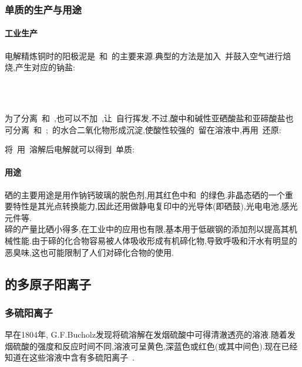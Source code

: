 \documentclass{ctexbook}
\begin{document}
\subsubsection{单质的生产与用途}
\paragraph{工业生产}
电解精炼铜时的阳极泥是~和~的主要来源\cite{Wang2016}.典型的方法是加入~并鼓入空气进行焙烧,产生对应的钠盐:
\begin{center}
    \\
    \\
\end{center}
为了分离~和~,也可以不加~,让~自行挥发.不过,酸中和碱性亚硒酸盐和亚碲酸盐也可分离~和~;~的水合二氧化物形成沉淀,使酸性较强的~留在溶液中,再用~还原:
\begin{center}
\end{center}
将~用~溶解后电解就可以得到~单质:
\begin{center}
\end{center}
\paragraph{用途}
硒的主要用途是用作钠钙玻璃的脱色剂,用其红色中和~的绿色.非晶态硒的一个重要特性是其光点转换能力,因此还用做静电复印中的光导体(即硒鼓),光电电池,感光元件等.\\
\indent 碲的产量比硒小得多,在工业中的应用也有限,基本用于低碳钢的添加剂以提高其机械性能.由于碲的化合物容易被人体吸收形成有机碲化物,导致呼吸和汗水有明显的恶臭味,这也可能限制了人们对碲化合物的使用.
\subsection{的多原子阳离子}
\subsubsection{多硫阳离子}
早在1804年, G.F.Bucholz发现将硫溶解在发烟硫酸中可得清澈透亮的溶液.随着发烟硫酸的强度和反应时间不同,溶液可呈黄色,深蓝色或红色(或其中间色).现在已经知道在这些溶液中含有多硫阳离子~.
\end{document}

